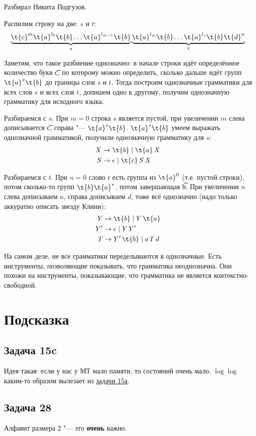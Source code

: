 	Разбирал Никита Подгузов.

	Распилим строку на две: $s$ и $t$:
	\[
		\underbrace{\t{c}^m \t{a}^{l_0} \t{b} \dots \t{a}^{l_{m-1}} \t{b}}_{s} \underbrace{\t{a}^{l_m}\t{b} \dots \t{a}^{l_z} \t{b} \t{d}^n}_{t}
	\]

	Заметим, что такое разбиение однозначно: в начале строки идёт определённое количество букв \t{c},
	по которому можно определить, сколько дальше идёт групп $\t{a}^x\t{b}$ до границы слов $s$ и $t$.
	Тогда построим однозначные грамматики для всех слов $s$ и всех слов $t$, допишем одно к другому,
	получим однозначную грамматику для исходного языка.

	Разбираемся с $s$.
	При $m=0$ строка $s$ является пустой, при увеличении $m$ слева дописывается \t{c}, справа "--- $\t{a}^*\t{b}$.
	$\t{a}^*\t{b}$ умеем выражать однозначной грамматикой, получили однозначную грамматику для $s$:
	\begin{align*}
		X &\to \t{b} \mid \t{a}\,X \\
		S &\to \epsilon \mid \t{c}\,S\,X
	\end{align*}

	Разбираемся с $t$.
	При $n=0$ слово $t$ есть группа из $\t{a}^0$ (т.е. пустой строки), потом сколько-то групп $\t{b}\t{a}^*$, потом завершающая \t{b}.
	При увеличении $n$ слева дописываем $a$, справа дописываем $d$, тоже всё однозначно (надо только аккуратно описать
	звезду Клини):
	\begin{align*}
		Y &\to \t{b} \mid Y\,\t{a} \\
		Y' &\to \epsilon \mid Y\,Y' \\
		T &\to Y'\,\t{b} \mid a\,T\,d
	\end{align*}

	\begin{Rem}
		На самом деле, не все грамматики переделываются в однозначные.
		Есть инструменты, позволяющие показывать, что грамматика неоднозначна.
		Они похожи на инструменты, показывающие, что грамматика не является контекстно-свободной.
	\end{Rem}

\section{Подсказка}
\subsection{Задача 15c}
	Идея такая: если у нас у МТ мало памяти, то состояний очень мало.
	$\log \log$ каким-то образом вылезает из \hyperref[prob15a]{задачи 15а}.
	\TODO

\subsection{Задача 28}
	Алфавит размера 2 "--- это \textbf{очень} важно.
